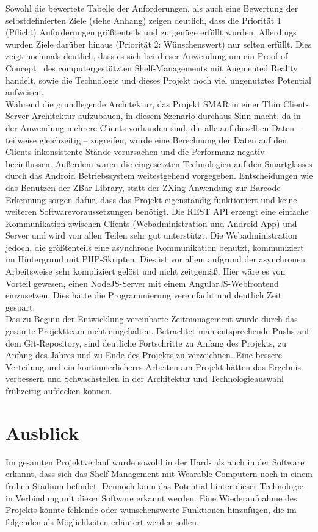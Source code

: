Sowohl die bewertete Tabelle der Anforderungen, als auch eine Bewertung der selbstdefinierten Ziele (siehe Anhang) zeigen deutlich, dass die Priorität 1 (Pflicht) Anforderungen größtenteils und zu genüge erfüllt wurden. Allerdings wurden Ziele darüber hinaus (Priorität 2: Wünschenswert) nur selten erfüllt. Dies zeigt nochmals deutlich, dass es sich bei dieser Anwendung um ein \glqq Proof of Concept\grqq~ des computergestützten Shelf-Managements mit Augmented Reality handelt, sowie die Technologie und dieses Projekt noch viel ungenutztes Potential aufweisen.\\

Während die grundlegende Architektur, das Projekt \ac{SMAR} in einer Thin Client-Server-Architektur aufzubauen, in diesem Szenario durchaus Sinn macht, da in der Anwendung mehrere Clients vorhanden sind, die alle auf dieselben Daten -- teilweise gleichzeitig -- zugreifen, würde eine Berechnung der Daten auf den Clients inkonsistente Stände verursachen und die Performanz negativ beeinflussen. Außerdem waren die eingesetzten Technologien auf den Smartglasses durch das Android Betriebssystem weitestgehend vorgegeben. Entscheidungen wie \zB das Benutzen der ZBar Library, statt der ZXing Anwendung zur Barcode-Erkennung sorgen dafür, dass das Projekt eigenständig funktioniert und keine weiteren Softwarevoraussetzungen benötigt. Die \acs{REST} \acs{API} erzeugt eine einfache Kommunikation zwischen Clients (Webadministration und Android-App) und Server und wird von allen Teilen sehr gut unterstützt. Die Webadministration jedoch, die größtenteils eine asynchrone Kommunikation benutzt, kommuniziert im Hintergrund mit PHP-Skripten. Dies ist vor allem aufgrund der asynchronen Arbeitsweise sehr kompliziert gelöst und nicht zeitgemäß. Hier wäre es von Vorteil gewesen, einen NodeJS-Server mit einem AngularJS-Webfrontend einzusetzen. Dies hätte die Programmierung vereinfacht und deutlich Zeit gespart.\\

Das zu Beginn der Entwicklung vereinbarte Zeitmanagement wurde durch das gesamte Projektteam nicht eingehalten. Betrachtet man entsprechende Pushs auf dem Git-Repository, sind deutliche Fortschritte zu Anfang des Projekts, zu Anfang des Jahres und zu Ende des Projekts zu verzeichnen. Eine bessere Verteilung und ein kontinuierlicheres Arbeiten am Projekt hätten das Ergebnis verbessern und Schwachstellen in der Architektur und Technologieauswahl frühzeitig aufdecken können.

\chapter{Ausblick}
\label{cha:ausblick}
Im gesamten Projektverlauf wurde sowohl in der Hard- als auch in der Software erkannt, dass sich das Shelf-Management mit Wearable-Computern noch in einem frühen Stadium befindet. Dennoch kann das Potential hinter dieser Technologie in Verbindung mit dieser Software erkannt werden. Eine Wiederaufnahme des Projekts könnte fehlende oder wünschenswerte Funktionen hinzufügen, die im folgenden als Möglichkeiten erläutert werden sollen.\\

